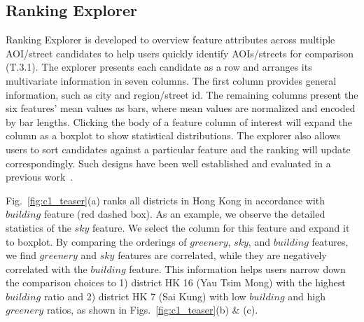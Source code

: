\subsection{Ranking Explorer}
Ranking Explorer is developed to overview feature attributes across multiple AOI/street candidates to help users quickly identify AOIs/streets for comparison (T.3.1).
The explorer presents each candidate as a row and arranges its multivariate information in seven columns.
The first column provides general information, such as city and region/street id. 
The remaining columns present the six features' mean values as bars, where mean values are normalized and encoded by bar lengths.
Clicking the body of a feature column of interest will expand the column as a boxplot to show statistical distributions.
The explorer also allows users to sort candidates against a particular feature and the ranking will update correspondingly.
Such designs have been well established and evaluated in a previous work~\cite{liu_2017_smartAdP}.

Fig.~\ref{fig:c1_teaser}(a) ranks all districts in Hong Kong in accordance with $building$ feature (red dashed box).
As an example, we observe the detailed statistics of the $sky$ feature.
We select the column for this feature and expand it to boxplot. 
By comparing the orderings of $greenery$, $sky$, and $building$ features, we find $greenery$ and $sky$ features are correlated, while they are negatively correlated with the $building$ feature.
This information helps users narrow down the comparison choices to 1) district HK 16 (Yau Tsim Mong) with the highest $building$ ratio and 2) district HK 7 (Sai Kung) with low $building$ and high $greenery$ ratios, as shown in Figs.~\ref{fig:c1_teaser}(b) \& (c).

